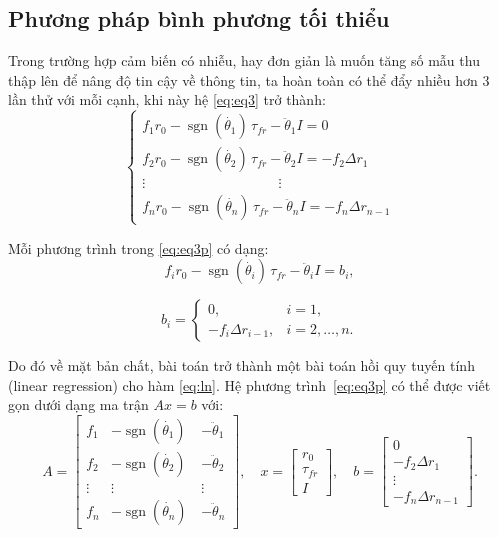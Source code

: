 \subsection{Phương pháp bình phương tối thiểu}
Trong trường hợp cảm biến có nhiễu, hay đơn giản là muốn tăng số mẫu thu thập lên để nâng độ tin cậy về thông tin, ta hoàn toàn có thể đẩy nhiều hơn 3 lần thử với mỗi cạnh, khi này hệ \ref{eq:eq3} trở thành:
\begin{equation}
\begin{cases}
\label{eq:eq3p}
f_1 r_0 - \operatorname{sgn}(\dot{\theta_1})\,\tau_{fr} - \ddot{\theta}_1 I = 0\\[3pt]
f_2 r_0 - \operatorname{sgn}(\dot{\theta_2})\,\tau_{fr} - \ddot{\theta}_2 I = -f_2 \Delta r_1\\[3pt]
\vdots\hspace{4cm}\vdots \\[3pt]
f_n r_0 - \operatorname{sgn}(\dot{\theta_n})\,\tau_{fr} - \ddot{\theta}_n I = -f_n \Delta r_{n-1}
\end{cases}
\end{equation}

Mỗi phương trình trong \ref{eq:eq3p} có dạng:
\begin{equation}
\label{eq:ln}
    f_i r_0 - \operatorname{sgn}(\dot{\theta_i})\,\tau_{fr} - \ddot{\theta}_i I = b_i,
\end{equation}

\begin{equation}
    b_i =
    \begin{cases}
        0, & i = 1,\\[4pt]
        - f_i \Delta r_{i-1}, & i = 2, \ldots, n.
    \end{cases}
\end{equation}

Do đó về mặt bản chất, bài toán trở thành một bài toán hồi quy tuyến tính (linear regression) cho hàm \ref{eq:ln}. Hệ phương trình~\ref{eq:eq3p} có thể được viết gọn dưới dạng ma trận $A x = b$ với:
\begin{equation}
A =
\begin{bmatrix}
f_1 & -\operatorname{sgn}(\dot{\theta_1})\, & -\ddot{\theta}_1\\
f_2 & -\operatorname{sgn}(\dot{\theta_2})\, & -\ddot{\theta}_2\\
\vdots & \vdots & \vdots\\
f_n & -\operatorname{sgn}(\dot{\theta_n})\, & -\ddot{\theta}_n
\end{bmatrix},
\quad
x =
\begin{bmatrix}
r_0\\[3pt]
\tau_{fr}\\[3pt]
I
\end{bmatrix},
\quad
b =
\begin{bmatrix}
0\\[3pt]
-f_2 \Delta r_1\\[3pt]
\vdots\\[3pt]
-f_n \Delta r_{n-1}
\end{bmatrix}.
\end{equation}

